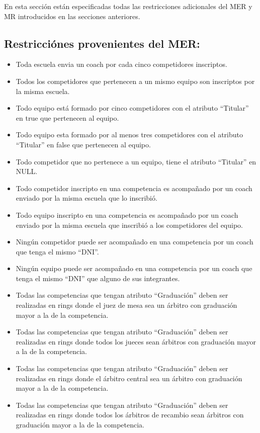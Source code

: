 En esta sección están especificadas todas las restricciones adicionales del MER y MR introducidos en las secciones anteriores.

\subsection{Restricciónes provenientes del MER:}
\begin{itemize}
\item Toda escuela envia un coach por cada cinco competidores inscriptos.
\item Todos los competidores que pertenecen a un mismo equipo son inscriptos por la misma escuela.
\item Todo equipo está formado por cinco competidores con el atributo ``Titular'' en true que pertenecen al equipo.
\item Todo equipo esta formado por al menos tres competidores con el atributo ``Titular'' en false que pertenecen al equipo.
\item Todo competidor que no pertenece a un equipo, tiene el atributo ``Titular'' en NULL.
\item Todo competidor inscripto en una competencia es acompañado por un coach enviado por la misma escuela que lo inscribió.
\item Todo equipo inscripto en una competencia es acompañado por un coach enviado por la misma escuela que inscribió a los competidores del equipo.
\item Ningún competidor puede ser acompañado en una competencia por un coach que tenga el mismo ``DNI''.
\item Ningún equipo puede ser acompañado en una competencia por un coach que tenga el mismo ``DNI'' que alguno de sus integrantes.
\item Todas las competencias que tengan atributo ``Graduación'' deben ser realizadas en rings donde el juez de mesa sea un árbitro con graduación mayor a la de la competencia.
\item Todas las competencias que tengan atributo ``Graduación'' deben ser realizadas en rings donde todos los jueces sean árbitros con graduación mayor a la de la competencia.
\item Todas las competencias que tengan atributo ``Graduación'' deben ser realizadas en rings donde el árbitro central sea un árbitro con graduación mayor a la de la competencia.
\item Todas las competencias que tengan atributo ``Graduación'' deben ser realizadas en rings donde todos los árbitros de recambio sean árbitros con graduación mayor a la de la competencia.

\end{itemize}
